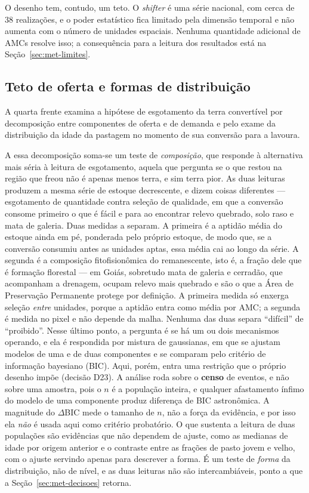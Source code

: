 O desenho tem, contudo, um teto. O \emph{shifter} é uma série nacional, com
cerca de 38 realizações, e o poder estatístico fica limitado pela dimensão
temporal e não aumenta com o número de unidades espaciais. Nenhuma quantidade
adicional de AMCs resolve isso; a consequência para a leitura dos resultados
está na Seção~\ref{sec:met-limites}.

\subsection{Teto de oferta e formas de distribuição}
\label{sec:met-teto}

A quarta frente examina a hipótese de esgotamento da terra convertível por
decomposição entre componentes de oferta e de demanda e pelo exame da
distribuição da idade da pastagem no momento de sua conversão para a lavoura.

A essa decomposição soma-se um teste de \emph{composição}, que responde à
alternativa mais séria à leitura de esgotamento, aquela que pergunta se o que
restou na região que freou não é apenas menos terra, e sim terra pior. As duas
leituras produzem a mesma série de estoque decrescente, e dizem coisas
diferentes --- esgotamento de quantidade contra seleção de qualidade, em que a
conversão consome primeiro o que é fácil e para ao encontrar relevo quebrado,
solo raso e mata de galeria. Duas medidas a separam. A primeira é a aptidão média do
estoque ainda em pé, ponderada pelo próprio estoque, de modo que, se a conversão consumiu
antes as unidades aptas, essa média cai ao longo da série. A segunda é a
composição fitofisionômica do remanescente, isto é, a fração dele que é
formação florestal --- em Goiás, sobretudo mata de galeria e cerradão, que
acompanham a drenagem, ocupam relevo mais quebrado e são o que a Área de
Preservação Permanente protege por definição. A primeira medida só enxerga
seleção \emph{entre} unidades, porque a aptidão entra como média por AMC; a
segunda é medida no pixel e não depende da malha. Nenhuma das duas separa
``difícil'' de ``proibido''.
Nesse último ponto, a pergunta é se há um ou dois mecanismos operando, e ela é
respondida por mistura de gaussianas, em que se ajustam modelos de uma e de
duas componentes e se comparam pelo critério de informação bayesiano (BIC).
Aqui, porém, entra uma restrição que o próprio desenho impõe (decisão D23). A
análise roda sobre o \textbf{censo} de eventos, e não sobre uma amostra, pois o $n$
é a população inteira, e qualquer afastamento ínfimo do modelo de uma
componente produz diferença de BIC astronômica. A magnitude do $\Delta$BIC
mede o tamanho de $n$, não a força da evidência, e por isso ela \emph{não} é
usada aqui como critério probatório. O que sustenta a leitura de duas
populações são evidências que não dependem de ajuste, como as medianas de
idade por origem anterior e o contraste entre as frações de pasto jovem e
velho, com o ajuste servindo apenas para descrever a forma. É um teste de
\emph{forma} da distribuição, não de nível, e as duas leituras não são
intercambiáveis, ponto a que a Seção~\ref{sec:met-decisoes} retorna.

